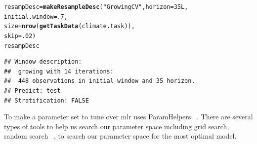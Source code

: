 \documentclass{article}\usepackage[]{graphicx}\usepackage[]{color}
\makeatletter
\newcommand{\hlnum}[1]{\textcolor[rgb]{0.686,0.059,0.569}{#1}}%
\newcommand{\hlstr}[1]{\textcolor[rgb]{0.192,0.494,0.8}{#1}}%
\newcommand{\hlstd}[1]{\textcolor[rgb]{0.345,0.345,0.345}{#1}}%
\newcommand{\hlkwb}[1]{\textcolor[rgb]{0.69,0.353,0.396}{#1}}%
\newcommand{\hlkwc}[1]{\textcolor[rgb]{0.333,0.667,0.333}{#1}}%
\newcommand{\hlkwd}[1]{\textcolor[rgb]{0.737,0.353,0.396}{\textbf{#1}}}%
\newenvironment{kframe}{%
 \def\at@end@of@kframe{}%
 \ifinner\ifhmode%
  \def\at@end@of@kframe{\end{minipage}}%
  \begin{minipage}{\columnwidth}%
 \fi\fi%
 \def\FrameCommand##1{\hskip\@totalleftmargin \hskip-\fboxsep
 \colorbox{shadecolor}{##1}\hskip-\fboxsep
     \hskip-\linewidth \hskip-\@totalleftmargin \hskip\columnwidth}%
 \MakeFramed {\advance\hsize-\width
   \@totalleftmargin\z@ \linewidth\hsize
   \@setminipage}}%
 {\par\unskip\endMakeFramed%
 \at@end@of@kframe}
\newenvironment{knitrout}{}{} %
\theoremstyle{definition}
\newcommand{\pkg}[1]{{\fontseries{b}\selectfont #1}}
\makeatother
\begin{document}
\begin{knitrout}
\color{fgcolor}\begin{kframe}
\begin{alltt}
\hlstd{resampDesc} \hlkwb{=} \hlkwd{makeResampleDesc}\hlstd{(}\hlstr{"GrowingCV"}\hlstd{,} \hlkwc{horizon} \hlstd{=} \hlnum{35L}\hlstd{,}
                               \hlkwc{initial.window} \hlstd{=} \hlnum{.7}\hlstd{,}
                               \hlkwc{size} \hlstd{=} \hlkwd{nrow}\hlstd{(}\hlkwd{getTaskData}\hlstd{(climate.task)),}
                               \hlkwc{skip} \hlstd{=} \hlnum{.02}\hlstd{)}
\hlstd{resampDesc}
\end{alltt}
\begin{verbatim}
## Window description:
##  growing with 14 iterations:
##  448 observations in initial window and 35 horizon.
## Predict: test
## Stratification: FALSE
\end{verbatim}
\end{kframe}
\end{knitrout}


To make a parameter set to tune over \pkg{mlr} uses \pkg{ParamHelpers} ~\cite{paramhelper}. There are several types of tools to help us search our parameter space including grid search, random search ~\cite{Bergstra}, to search our parameter space for the most optimal model.
\end{document}
